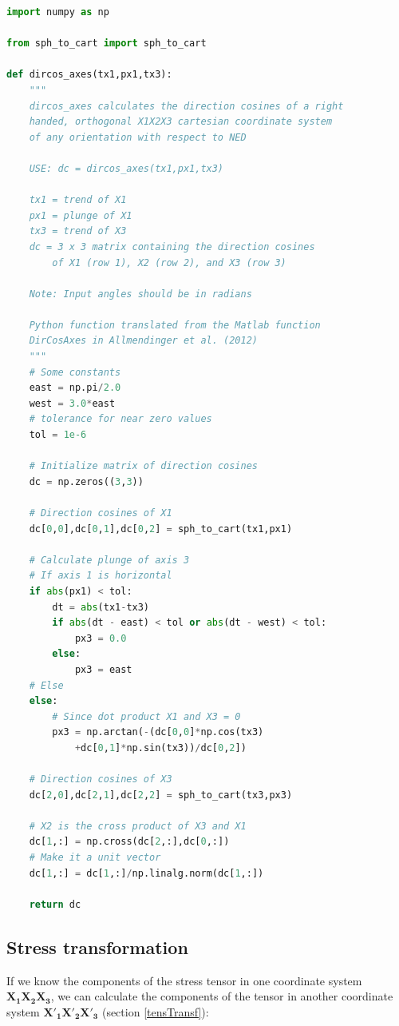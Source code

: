 \documentclass[a4paper , 12pt]{book}
\begin{document}
\begin{center}
\begin{lstlisting}[language=Python, frame=single]
import numpy as np

from sph_to_cart import sph_to_cart

def dircos_axes(tx1,px1,tx3):
	"""
	dircos_axes calculates the direction cosines of a right
	handed, orthogonal X1X2X3 cartesian coordinate system
	of any orientation with respect to NED
	
	USE: dc = dircos_axes(tx1,px1,tx3)
	
	tx1 = trend of X1
	px1 = plunge of X1
	tx3 = trend of X3
	dc = 3 x 3 matrix containing the direction cosines
		of X1 (row 1), X2 (row 2), and X3 (row 3)
	
	Note: Input angles should be in radians
	
	Python function translated from the Matlab function
	DirCosAxes in Allmendinger et al. (2012)
	"""
	# Some constants
	east = np.pi/2.0
	west = 3.0*east
	# tolerance for near zero values
	tol = 1e-6 
	
	# Initialize matrix of direction cosines
	dc = np.zeros((3,3))
	
	# Direction cosines of X1
	dc[0,0],dc[0,1],dc[0,2] = sph_to_cart(tx1,px1)
	
	# Calculate plunge of axis 3
	# If axis 1 is horizontal
	if abs(px1) < tol:
		dt = abs(tx1-tx3)
		if abs(dt - east) < tol or abs(dt - west) < tol:
			px3 = 0.0
		else:
			px3 = east
	# Else
	else:
		# Since dot product X1 and X3 = 0
		px3 = np.arctan(-(dc[0,0]*np.cos(tx3)
			+dc[0,1]*np.sin(tx3))/dc[0,2])
	
	# Direction cosines of X3
	dc[2,0],dc[2,1],dc[2,2] = sph_to_cart(tx3,px3)
	
	# X2 is the cross product of X3 and X1
	dc[1,:] = np.cross(dc[2,:],dc[0,:])
	# Make it a unit vector
	dc[1,:] = dc[1,:]/np.linalg.norm(dc[1,:])
	
	return dc
\end{lstlisting}
\end{center}

\subsection{Stress transformation}

If we know the components of the stress tensor in one coordinate system $\mathbf{X_1X_2X_3}$, we can calculate the components of the tensor in another coordinate system $\mathbf{X'_1X'_2X'_3}$ (section \ref{tensTransf}):
\end{document}
